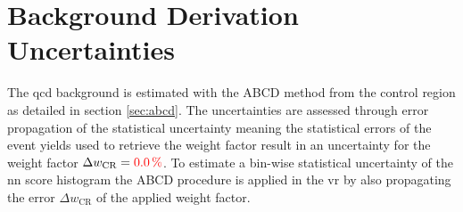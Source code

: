 \section{Background Derivation Uncertainties}
The \ac{qcd} background is estimated with the ABCD method from the control region as detailed in section \ref{sec:abcd}. The uncertainties are assessed through error propagation of the statistical uncertainty meaning the statistical errors of the event yields used to retrieve the weight factor result in an uncertainty for the weight factor $\Delta w_\text{CR}= \textcolor{red}{\qty[]{0.0}{\percent}}$. To estimate a bin-wise statistical uncertainty of the \ac{nn} score histogram the ABCD procedure is applied in the \ac{vr} by also propagating the error $\Delta w_\text{CR}$ of the applied weight factor.